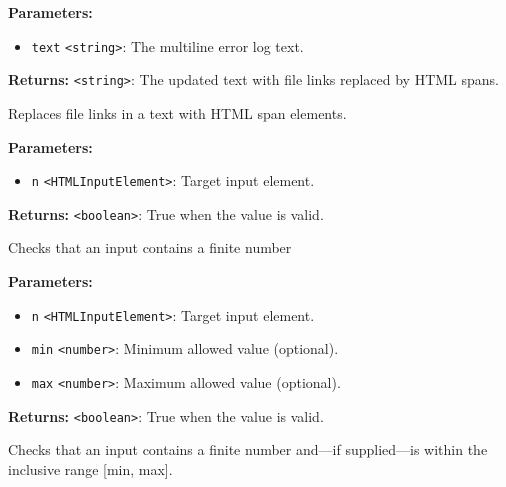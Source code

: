 \documentclass[12pt,a4paper]{article}
\begin{document}
\noindent \textbf{Parameters:}
\begin{itemize}
  \item \texttt{text} \texttt{<string>}: The multiline error log text.
\end{itemize}

\noindent \textbf{Returns:} \texttt{<string>}: The updated text with file links replaced by HTML spans.

\noindent Replaces file links in a text with HTML span elements.

\vspace{5mm}
\noindent {}


\noindent \textbf{Parameters:}
\begin{itemize}
  \item \texttt{n} \texttt{<HTMLInputElement>}: Target input element.
\end{itemize}

\noindent \textbf{Returns:} \texttt{<boolean>}: True when the value is valid.

\noindent Checks that an input contains a finite number

\vspace{5mm}
\noindent {}


\noindent \textbf{Parameters:}
\begin{itemize}
  \item \texttt{n} \texttt{<HTMLInputElement>}: Target input element.
  \item \texttt{min} \texttt{<number>}: Minimum allowed value (optional).
  \item \texttt{max} \texttt{<number>}: Maximum allowed value (optional).
\end{itemize}

\noindent \textbf{Returns:} \texttt{<boolean>}: True when the value is valid.

\noindent Checks that an input contains a finite number
and—if supplied—is within the inclusive range [min, max].

\vspace{5mm}
\noindent {}
\end{document}
